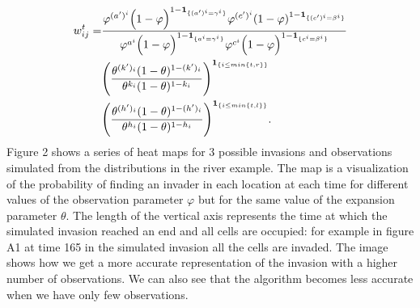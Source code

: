 \begin{align*}
    w_{ij}^t = & \frac{\varphi^{(a')^i} \Big(1-\varphi \Big)^{1-\mathbf{1}_{\{(a')^i = \gamma^i\}}} \varphi^{(c')^i}(1-\varphi)^{1-\mathbf{1}_{\{(c')^i = \beta^i\}}}}{\varphi^{a^i} \Big(1-\varphi \Big)^{1-\mathbf{1}_{\{a^i = \gamma^i\}}} \varphi^{c^i} \Big(1-\varphi \Big)^{1-\mathbf{1}_{\{c^i = \beta^i\}}}} \\ \nonumber
    & \Bigg(\frac{\theta^{(k')_i} (1-\theta )^{1-(k')_i} }{ \theta^{k_i} (1-\theta )^{1-k_i}} \Bigg)^{\mathbf{1}_{\{i \leq min\{ t, r\}\}} } \\ \nonumber
    & \Bigg( \frac{ \theta^{(h')_i} (1-\theta )^{1-(h')_i} }{ \theta^{h_i} (1-\theta )^{1-h_i} } \Bigg)^{\mathbf{1}_{\{i \leq min\{ t, l\}\}}}.
\end{align*}
Figure 2 shows a series of heat maps for 3 possible invasions and observations simulated from the distributions in the river example. The map is a visualization of the probability of finding an invader in each location at each time for different values of the observation parameter $\varphi$ but for the same value of the expansion  parameter $\theta$. The length of the vertical axis represents the time at which the simulated invasion reached an end and all cells are occupied: for example in figure A1 at time 165 in the simulated invasion all the cells are invaded. The image shows how we get a more accurate representation of the invasion with a higher number of observations. We can also see that the algorithm becomes less accurate when we have only few observations.


